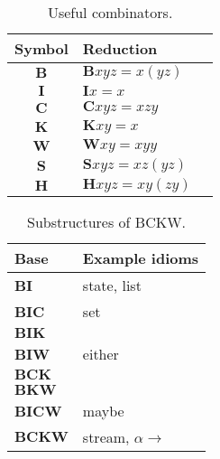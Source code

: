 \begin{table}\centering
\begin{tabular}{cll}
Symbol & Reduction \\
\hline
$\mathbf{B}$ & $\mathbf{B} x y z = x (y z)$ \\
$\mathbf{I}$ & $\mathbf{I} x = x$ \\
\hline
$\mathbf{C}$ & $\mathbf{C} x y z = x z y$ \\
$\mathbf{K}$ & $\mathbf{K} x y = x$ \\
$\mathbf{W}$ & $\mathbf{W} x y = x y y$ \\
$\mathbf{S}$ & $\mathbf{S} x y z = x z (y z)$ \\
$\mathbf{H}$ & $\mathbf{H} x y z = x y (z y)$ \\
\end{tabular}
\caption{Useful combinators.}
\label{tab:combinators}
\end{table}

\begin{table}\centering
\begin{tabular}{ll}
Base & Example idioms \\
\hline
$\mathbf{BI}$ & state, list \\
$\mathbf{BIC}$ & set \\
$\mathbf{BIK}$ & \\
$\mathbf{BIW}$ & either \\
$\mathbf{BCK}$ & \\
$\mathbf{BKW}$ & \\
$\mathbf{BICW}$ & maybe \\
$\mathbf{BCKW}$ & stream, $\alpha \to$ \\
\end{tabular}
\caption{Substructures of BCKW.}
\label{tab:combinator-bases}
\end{table}

\todo
